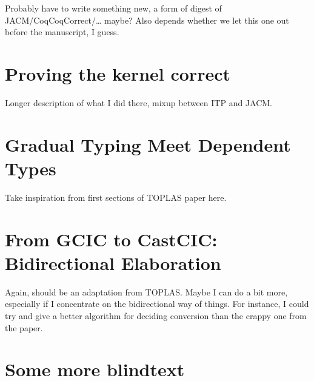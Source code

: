 \documentclass[
  french,english,
	fontsize=10pt, %
	twoside=true, %
	secnumdepth=1, %
  numbers=noenddot,
]{kaobook/kaobook}
\begin{document}
Probably have to write something new, a form of digest of JACM/CoqCoqCorrect/… maybe? Also depends whether we let this one out before the manuscript, I guess.

\chapter{Proving the kernel correct}
\label{chap:kernel-correctness}

Longer description of what I did there, mixup between ITP and JACM.

\label{part:gradual}

\chapter{Gradual Typing Meet Dependent Types}
\label{chap:gradual-dependent}

Take inspiration from first sections of TOPLAS paper here.

\chapter{From GCIC to CastCIC: Bidirectional Elaboration}
\label{chap:bidir-gradual-elab}

Again, should be an adaptation from TOPLAS. Maybe I can do a bit more, especially if
I concentrate on the bidirectional way of things. For instance, I could try and give a better algorithm for deciding conversion than the crappy one from the paper.

\appendix %


\chapter{Some more blindtext}

\blindtext


\backmatter %

\end{document}
